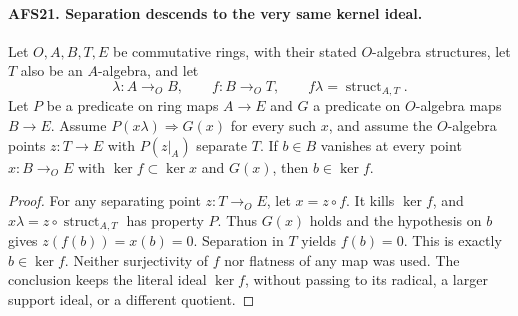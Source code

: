 \paragraph{AFS21. Separation descends to the very same kernel ideal.}
\label{claim:AFS21}
Let $O,A,B,T,E$ be commutative rings, with their stated
$O$-algebra structures, let $T$ also be an $A$-algebra,
and let
\[
 \lambda:A\to_O B,\qquad f:B\to_O T,
          \qquad f\lambda=\operatorname{struct}_{A,T}.
\]
Let $P$ be a predicate on ring maps $A\to E$ and $G$ a
predicate on $O$-algebra maps $B\to E$.  Assume
$P(x\lambda)\Rightarrow G(x)$ for every such $x$, and
assume the $O$-algebra points $z:T\to E$ with
$P(z|_A)$ separate $T$.  If $b\in B$ vanishes at
every point $x:B\to_O E$ with
$\ker f\subset\ker x$ and $G(x)$, then $b\in\ker f$.
\begin{proof}
For any separating point $z:T\to_O E$, let $x=z\circ f$.
It kills $\ker f$, and
$x\lambda=z\circ\operatorname{struct}_{A,T}$ has property
$P$.  Thus $G(x)$ holds and the hypothesis on $b$ gives
$z(f(b))=x(b)=0$.  Separation in $T$ yields $f(b)=0$.
This is exactly $b\in\ker f$.  Neither surjectivity of
$f$ nor flatness of any map was used.  The conclusion
keeps the literal ideal $\ker f$, without passing to
its radical, a larger support ideal, or a different
quotient.
\end{proof}

